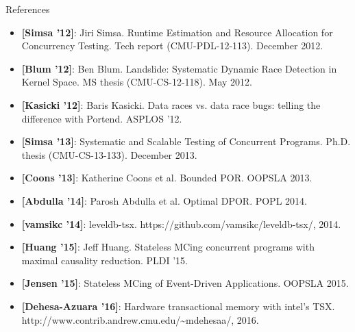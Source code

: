 \documentclass[xcolor=dvipsnames]{beamer}
\begin{document}
\begin{frame}{References}
	\footnotesize
	\begin{itemize}
		\item {\bf [Simsa '12]}: Jiri Simsa. Runtime Estimation and Resource Allocation for
			Concurrency Testing. Tech report (CMU-PDL-12-113). December 2012.
		\item {\bf [Blum '12]}: Ben Blum. Landslide: Systematic Dynamic Race Detection in Kernel Space.
			MS thesis (CMU-CS-12-118). May 2012.
		\item {\bf [Kasicki '12]}: Baris Kasicki. Data races vs. data race bugs: telling the difference with Portend. ASPLOS '12.
		\item {\bf [Simsa '13]}: Systematic and Scalable Testing of Concurrent Programs.
			Ph.D. thesis (CMU-CS-13-133). December 2013.
		\item {\bf [Coons '13]}: Katherine Coons et al. Bounded POR. OOPSLA 2013.
		\item {\bf [Abdulla '14]}: Parosh Abdulla et al. Optimal DPOR. POPL 2014.
		\item {\bf [vamsikc '14]}: leveldb-tsx. https://github.com/vamsikc/leveldb-tsx/, 2014.
		\item {\bf [Huang '15]}: Jeff Huang. Stateless MCing concurrent programs with maximal causality reduction. PLDI '15.
		\item {\bf [Jensen '15]}: Stateless MCing of Event-Driven Applications. OOPSLA 2015.
		\item {\bf [Dehesa-Azuara '16]}: Hardware transactional memory with intel's TSX.
			http://www.contrib.andrew.cmu.edu/\textasciitilde{}mdehesaa/, 2016.
	\end{itemize}
\end{frame}
\end{document}
